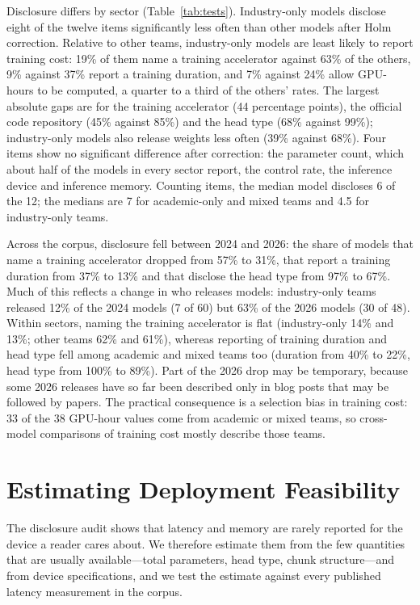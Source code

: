 \documentclass[applsci,review,submit,pdftex,oneauthor]{Definitions/mdpi}
\begin{document}
Disclosure differs by sector (Table~\ref{tab:tests}). Industry-only models disclose eight of the twelve items significantly less often than other models after Holm correction. Relative to other teams, industry-only models are least likely to report training cost: 19\% of them name a training accelerator against 63\% of the others, 9\% against 37\% report a training duration, and 7\% against 24\% allow GPU-hours to be computed, a quarter to a third of the others' rates. The largest absolute gaps are for the training accelerator (44 percentage points), the official code repository (45\% against 85\%) and the head type (68\% against 99\%); industry-only models also release weights less often (39\% against 68\%). Four items show no significant difference after correction: the parameter count, which about half of the models in every sector report, the control rate, the inference device and inference memory. Counting items, the median model discloses 6 of the 12; the medians are 7 for academic-only and mixed teams and 4.5 for industry-only teams.



Across the corpus, disclosure fell between 2024 and 2026: the share of models that name a training accelerator dropped from 57\% to 31\%, that report a training duration from 37\% to 13\% and that disclose the head type from 97\% to 67\%. Much of this reflects a change in who releases models: industry-only teams released 12\% of the 2024 models (7 of 60) but 63\% of the 2026 models (30 of 48). Within sectors, naming the training accelerator is flat (industry-only 14\% and 13\%; other teams 62\% and 61\%), whereas reporting of training duration and head type fell among academic and mixed teams too (duration from 40\% to 22\%, head type from 100\% to 89\%). Part of the 2026 drop may be temporary, because some 2026 releases have so far been described only in blog posts that may be followed by papers. The practical consequence is a selection bias in training cost: 33 of the 38 GPU-hour values come from academic or mixed teams, so cross-model comparisons of training cost mostly describe those teams.

\section{Estimating Deployment Feasibility}\label{sec:estimator}

The disclosure audit shows that latency and memory are rarely reported for the device a reader cares about. We therefore estimate them from the few quantities that are usually available---total parameters, head type, chunk structure---and from device specifications, and we test the estimate against every published latency measurement in the corpus.
\end{document}
